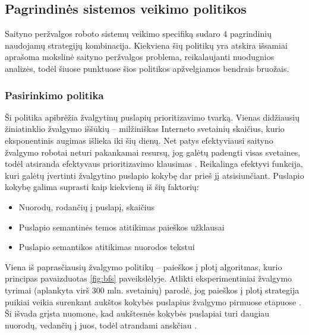\subsection{Pagrindinės sistemos veikimo politikos}

Saityno peržvalgos roboto sistemų veikimo specifiką sudaro 4 pagrindinių naudojamų strategijų kombinacija. Kiekviena šių politikų yra atskira išsamiai aprašoma mokslinė saityno peržvalgos problema, reikalaujanti nuodugnios analizės, todėl šiuose punktuose šios politikos apžvelgiamos bendrais bruožais.

\subsubsection{Pasirinkimo politika}

Ši politika apibrėžia žvalgytinų puslapių prioritizavimo tvarką. Vienas didžiausių žiniatinklio žvalgymo iššūkių -- milžiniškas Interneto svetainių skaičius, kurio eksponentinis augimas išlieka iki šių dienų. Net patys efektyviausi saityno žvalgymo robotai neturi pakankamai resursų, jog galėtų padengti visas svetaines, todėl atsiranda efektyvaus prioritizavimo klausimas \cite{EffectiveWebCrawling}. Reikalinga efektyvi funkcija, kuri galėtų įvertinti žvalgytino puslapio kokybę dar prieš jį atsisiunčiant. Puslapio kokybę galima suprasti kaip kiekvieną iš šių faktorių:

\begin{itemize}
    \item Nuorodų, rodančių į puslapį, skaičius
    \item Puslapio semantinės temos atitikimas paieškos užklausai
    \item Puslapio semantikos atitikimas nuorodos tekstui
\end{itemize}


Viena iš paprasčiausių žvalgymo politikų -- paieškos į plotį algoritmas, kurio principas pavaizduotas \ref{fig:bfs} paveikslėlyje. Atlikti eksperimentiniai žvalgymo tyrimai (aplankyta virš 300 mln. svetainių) parodė, jog paieškos į plotį strategija puikiai veikia surenkant aukštos kokybės puslapius žvalgymo pirmuose etapuose \cite{EffectiveWebCrawling}. Ši išvada grįsta nuomone, kad aukštesnės kokybės puslapiai turi daugiau nuorodų, vedančių į juos, todėl atrandami anskčiau \cite{EffectiveWebCrawling}.




